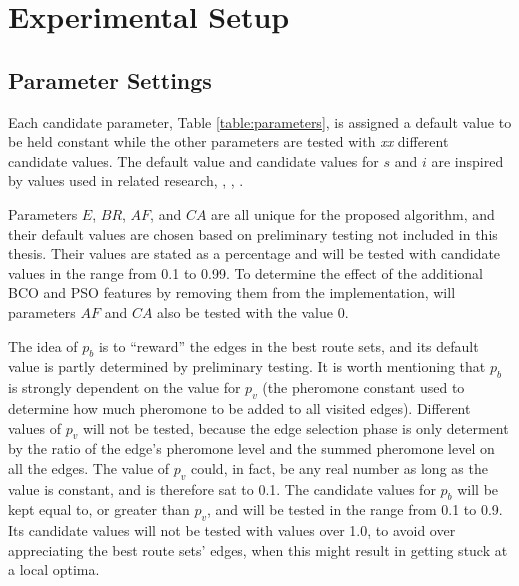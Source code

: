 \section{Experimental Setup}


\subsection{Parameter Settings}
\label{subsec:parameterSettings_setup}

Each candidate parameter, Table \vref{table:parameters}, is assigned a default value to be held constant while the other parameters are tested with \textit{xx} different candidate values.
The default value and candidate values for $s$ and $i$ are inspired by values used in related research\citep{salehi-nezhad07}, \citep{poorzahedy11}, \citep{sedighpour14}, \citep{kechagiopoulos14}.

Parameters $E$, $BR$, $AF$, and $CA$ are all unique for the proposed algorithm, and their default values are chosen based on preliminary testing not included in this thesis. Their values are stated as a percentage and will be tested with candidate values in the range from 0.1 to 0.99. To determine the effect of the additional BCO and PSO features by removing them from the implementation, will parameters $AF$ and $CA$ also be tested with the value 0.

The idea of $p_b$ is to ``reward'' the edges in the best route sets, and its default value is partly determined by preliminary testing. It is worth mentioning that $p_ b$ is strongly dependent on the value for $p_v$ (the pheromone constant used to determine how much pheromone to be added to all visited edges). Different values of $p_v$ will not be tested, because the edge selection phase is only determent by the ratio of the edge's pheromone level and the summed pheromone level on all the edges. The value of $p_v$ could, in fact, be any real number as long as the value is constant, and is therefore sat to 0.1. The candidate values for $p_b$ will be kept equal to, or greater than $p_v$, and will be tested in the range from 0.1 to 0.9. Its candidate values will not be tested with values over 1.0, to avoid over appreciating the best route sets' edges, when this might result in getting stuck at a local optima.


